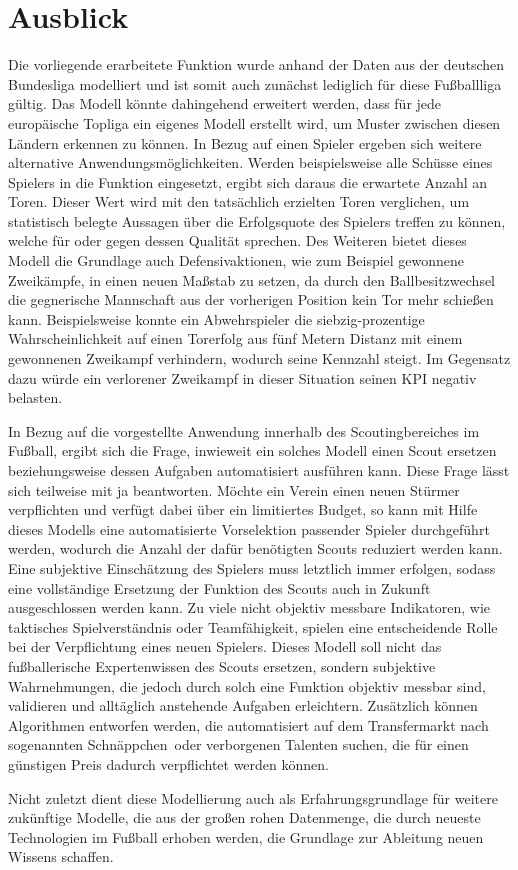\section{Ausblick}
\label{ausblick}

Die vorliegende erarbeitete Funktion wurde anhand der Daten aus der deutschen Bundesliga modelliert und ist somit auch zunächst lediglich für diese Fußballliga gültig. Das Modell könnte dahingehend erweitert werden, dass für jede europäische Topliga ein eigenes Modell erstellt wird, um Muster zwischen diesen Ländern erkennen zu können. In Bezug auf einen Spieler ergeben sich weitere alternative Anwendungsmöglichkeiten. Werden beispielsweise alle Schüsse eines Spielers in die Funktion eingesetzt, ergibt sich daraus die erwartete Anzahl an Toren. Dieser Wert wird mit den tatsächlich erzielten Toren verglichen, um statistisch belegte Aussagen über die Erfolgsquote des Spielers treffen zu können, welche für oder gegen dessen Qualität sprechen. Des Weiteren bietet dieses Modell die Grundlage auch Defensivaktionen, wie zum Beispiel gewonnene Zweikämpfe, in einen neuen Maßstab zu setzen, da durch den Ballbesitzwechsel die gegnerische Mannschaft aus der vorherigen Position kein Tor mehr schießen kann. Beispielsweise konnte ein Abwehrspieler die siebzig-prozentige Wahrscheinlichkeit auf einen Torerfolg aus fünf Metern Distanz mit einem gewonnenen Zweikampf verhindern, wodurch seine Kennzahl steigt. Im Gegensatz dazu würde ein verlorener Zweikampf in dieser Situation seinen KPI negativ belasten.

In Bezug auf die vorgestellte Anwendung innerhalb des Scoutingbereiches im Fußball, ergibt sich die Frage, inwieweit ein solches Modell einen Scout ersetzen beziehungsweise dessen Aufgaben automatisiert ausführen kann. Diese Frage lässt sich teilweise mit ja beantworten. Möchte ein Verein einen neuen Stürmer verpflichten und verfügt dabei über ein limitiertes Budget, so kann mit Hilfe dieses Modells eine automatisierte Vorselektion passender Spieler durchgeführt werden, wodurch die Anzahl der dafür benötigten Scouts reduziert werden kann. Eine subjektive Einschätzung des Spielers muss letztlich immer erfolgen, sodass eine vollständige Ersetzung der Funktion des Scouts auch in Zukunft ausgeschlossen werden kann. Zu viele nicht objektiv messbare Indikatoren, wie taktisches Spielverständnis oder Teamfähigkeit, spielen eine entscheidende Rolle bei der Verpflichtung eines neuen Spielers. Dieses Modell soll nicht das fußballerische Expertenwissen des Scouts ersetzen, sondern subjektive Wahrnehmungen, die jedoch durch solch eine Funktion objektiv messbar sind, validieren und alltäglich anstehende Aufgaben erleichtern. Zusätzlich können Algorithmen entworfen werden, die automatisiert auf dem Transfermarkt nach sogenannten \glqq Schnäppchen\grqq~oder verborgenen Talenten suchen, die für einen günstigen Preis dadurch verpflichtet werden können. 

\enlargethispage{\baselineskip}Nicht zuletzt dient diese Modellierung auch als Erfahrungsgrundlage für weitere zukünftige Modelle, die aus der großen rohen Datenmenge, die durch neueste Technologien im Fußball erhoben werden, die Grundlage zur Ableitung neuen Wissens schaffen.